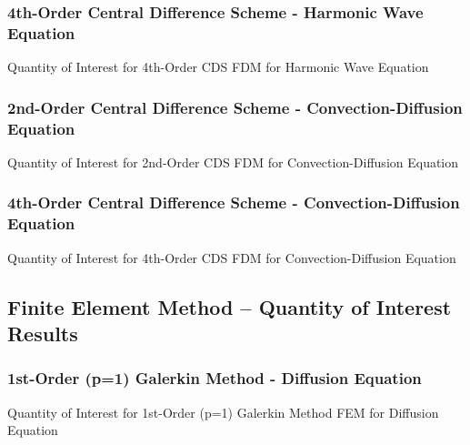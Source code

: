 \documentclass[10pt]{article}		%
\numberwithin{equation}{section}
\begin{document}
\subsubsection{4th-Order Central Difference Scheme - Harmonic Wave Equation}

\begin{table}[H]
	\caption{Quantity of Interest for 4th-Order CDS FDM for Harmonic Wave Equation}	
	
	
\end{table}

\newpage

\subsubsection{2nd-Order Central Difference Scheme - Convection-Diffusion Equation}

\begin{table}[H]
	\caption{Quantity of Interest for 2nd-Order CDS FDM for Convection-Diffusion Equation}	
	
	
\end{table}

\subsubsection{4th-Order Central Difference Scheme - Convection-Diffusion Equation}

\begin{table}[H]
	\caption{Quantity of Interest for 4th-Order CDS FDM for Convection-Diffusion Equation}
		
		
\end{table}

\newpage

\subsection{Finite Element Method -- Quantity of Interest Results}

\subsubsection{1st-Order (p=1) Galerkin Method - Diffusion Equation}

\begin{table}[H]
	\caption{Quantity of Interest for  1st-Order (p=1) Galerkin Method FEM for Diffusion Equation}	
	
	
\end{table}
\end{document}
